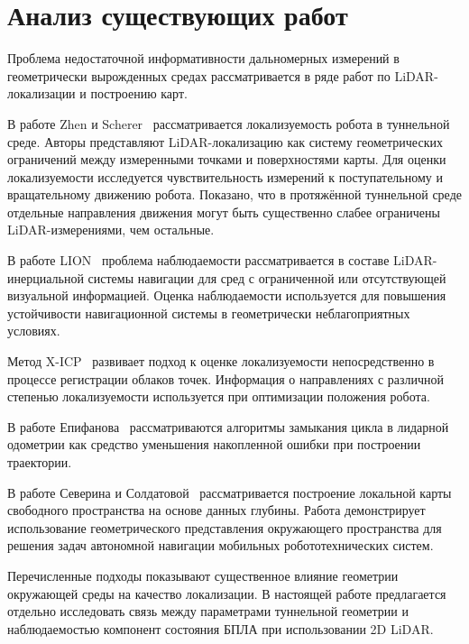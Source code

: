 \documentclass{misisarticle}
\begin{document}
\section{Анализ существующих работ}

Проблема недостаточной информативности дальномерных измерений
в геометрически вырожденных средах рассматривается в ряде работ
по LiDAR-локализации и построению карт.

В работе Zhen и Scherer~\cite{zhen2019} рассматривается локализуемость
робота в туннельной среде. Авторы представляют LiDAR-локализацию
как систему геометрических ограничений между измеренными точками
и поверхностями карты. Для оценки локализуемости исследуется
чувствительность измерений к поступательному и вращательному
движению робота. Показано, что в протяжённой туннельной среде
отдельные направления движения могут быть существенно слабее
ограничены LiDAR-измерениями, чем остальные.

В работе LION~\cite{tagliabue2020} проблема наблюдаемости
рассматривается в составе LiDAR-инерциальной системы навигации
для сред с ограниченной или отсутствующей визуальной информацией.
Оценка наблюдаемости используется для повышения устойчивости
навигационной системы в геометрически неблагоприятных условиях.

Метод X-ICP~\cite{tuna2024} развивает подход к оценке
локализуемости непосредственно в процессе регистрации облаков
точек. Информация о направлениях с различной степенью
локализуемости используется при оптимизации положения робота.

В работе Епифанова~\cite{epifanov2024} рассматриваются алгоритмы
замыкания цикла в лидарной одометрии как средство уменьшения
накопленной ошибки при построении траектории.

В работе Северина и Солдатовой~\cite{severin2026} рассматривается
построение локальной карты свободного пространства на основе
данных глубины. Работа демонстрирует использование геометрического
представления окружающего пространства для решения задач
автономной навигации мобильных робототехнических систем.

Перечисленные подходы показывают существенное влияние геометрии
окружающей среды на качество локализации. В настоящей работе
предлагается отдельно исследовать связь между параметрами
туннельной геометрии и наблюдаемостью компонент состояния БПЛА
при использовании 2D LiDAR.
\end{document}
